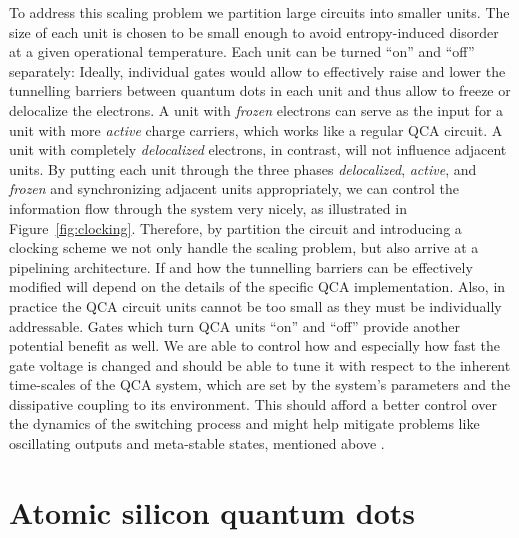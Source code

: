 To address this scaling problem we partition large circuits into smaller units.
The size of each unit is chosen to be small enough to avoid entropy-induced
disorder at a given operational temperature. Each unit can be turned ``on'' and
``off'' separately: Ideally, individual gates would allow to effectively raise
and lower the tunnelling barriers between quantum dots in each unit and thus
allow to freeze or delocalize the electrons. A unit with \emph{frozen} electrons
can serve as the input for a unit with more \emph{active} charge carriers, which
works like a regular QCA circuit. A unit with completely \emph{delocalized}
electrons, in contrast, will not influence adjacent units. By putting each unit
through the three phases \emph{delocalized}, \emph{active}, and \emph{frozen}
and synchronizing adjacent units appropriately, we can control the information
flow through the system very nicely, as illustrated in Figure~\ref{fig:clocking}.
Therefore, by partition the circuit and introducing a clocking scheme we not
only handle the scaling problem, but also arrive at a pipelining architecture.
If and how the tunnelling barriers can be effectively modified will depend on
the details of the specific QCA implementation. Also, in practice the QCA
circuit units cannot be too small as they must be individually addressable.
Gates which turn QCA units ``on'' and ``off'' provide another potential benefit
as well. We are able to control how and especially how fast the gate voltage is
changed and should be able to tune it with respect to the inherent time-scales
of the QCA system, which are set by the system's parameters and the dissipative
coupling to its environment. This should afford a better control over the
dynamics of the switching process and might help mitigate problems like
oscillating outputs and meta-stable states, mentioned above
\cite{lent1997device}.


\section{Atomic silicon quantum dots}

